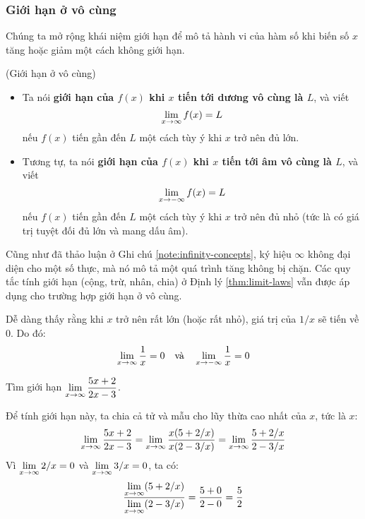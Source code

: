
\subsubsection{Giới hạn ở vô cùng}

Chúng ta mở rộng khái niệm giới hạn để mô tả hành vi của hàm số khi biến số $x$ tăng hoặc giảm một cách không giới hạn.

\begin{definition} (Giới hạn ở vô cùng)
    \begin{itemize}
        \item Ta nói \textbf{giới hạn của $f(x)$ khi $x$ tiến tới dương vô cùng là $L$}, và viết
        \begin{equation*}
            \lim\limits_{x \to \infty} f(x) = L
        \end{equation*}
        nếu $f(x)$ tiến gần đến $L$ một cách tùy ý khi $x$ trở nên đủ lớn.
        
        \item Tương tự, ta nói \textbf{giới hạn của $f(x)$ khi $x$ tiến tới âm vô cùng là $L$}, và viết
        \begin{equation*}
            \lim\limits_{x \to -\infty} f(x) = L
        \end{equation*}
        nếu $f(x)$ tiến gần đến $L$ một cách tùy ý khi $x$ trở nên đủ nhỏ (tức là có giá trị tuyệt đối đủ lớn và mang dấu âm).
    \end{itemize}
\end{definition}

Cũng như đã thảo luận ở Ghi chú \ref{note:infinity-concepts}, ký hiệu $\infty$ không đại diện cho một số thực, mà nó mô tả một quá trình tăng không bị chặn. Các quy tắc tính giới hạn (cộng, trừ, nhân, chia) ở Định lý \ref{thm:limit-laws} vẫn được áp dụng cho trường hợp giới hạn ở vô cùng.

\begin{example}
    Dễ dàng thấy rằng khi $x$ trở nên rất lớn (hoặc rất nhỏ), giá trị của $1/x$ sẽ tiến về 0. Do đó:
    \begin{equation*}
        \lim\limits_{x \to \infty} \dfrac{1}{x} = 0 \quad \text{và} \quad \lim\limits_{x \to -\infty} \dfrac{1}{x} = 0
    \end{equation*}
\end{example}

\begin{example}
    Tìm giới hạn $\lim\limits_{x \to \infty} \dfrac{5x+2}{2x-3}$.
    
    Để tính giới hạn này, ta chia cả tử và mẫu cho lũy thừa cao nhất của $x$, tức là $x$:
    \begin{equation*}
        \lim\limits_{x \to \infty} \dfrac{5x+2}{2x-3} = \lim\limits_{x \to \infty} \dfrac{x(5 + 2/x)}{x(2 - 3/x)} = \lim\limits_{x \to \infty} \dfrac{5 + 2/x}{2 - 3/x}
    \end{equation*}
    Vì $\lim\limits_{x \to \infty} 2/x = 0$ và $\lim\limits_{x \to \infty} 3/x = 0$, ta có:
    \begin{equation*}
        \dfrac{\lim\limits_{x \to \infty} (5 + 2/x)}{\lim\limits_{x \to \infty} (2 - 3/x)} = \dfrac{5+0}{2-0} = \dfrac{5}{2}
    \end{equation*}
\end{example}

